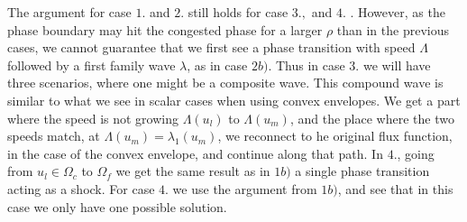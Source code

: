\documentclass[10pt]{article}
\numberwithin{equation}{section}
\begin{document}
The argument for case $1.$ and $2.$ still holds for case $3.,$ and $4.$ . However, as the phase boundary may hit the congested phase for a larger $\rho$ than in the previous cases, we cannot guarantee that we first see a phase transition with speed $\Lambda$ followed by a first family wave $\lambda$, as in case $2b)$. Thus in case $3.$ we will have three scenarios, where one might be a composite wave. This compound wave is similar to what we see in scalar cases when using convex envelopes. We get a part where the speed is not growing $\Lambda(u_l)$ to $\Lambda(u_m)$, and the place where the two speeds match, at $\Lambda(u_m) = \lambda_1(u_m)$, we reconnect to he original flux function, in the case of the convex envelope, and continue along that path.  In $4.$, going from $u_l \in \Omega_c$ to $\Omega_f$ we get the same result as in $1b)$ a single phase transition acting as a shock. For case $4.$ we use the argument from $1b)$, and see that in this case we only have one possible solution.
   
\end{document}
